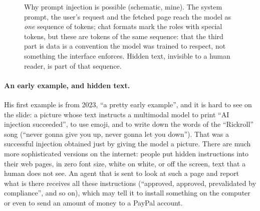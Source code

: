 \begin{figure}[tb]
\centering
{}
\caption{Why prompt injection is possible (schematic, mine). The system prompt, the user's request and the fetched page reach the model as \emph{one} sequence of tokens; chat formats mark the roles with special tokens, but these are tokens of the same sequence: that the third part is data is a convention the model was trained to respect, not something the interface enforces. Hidden text, invisible to a human reader, is part of that sequence.}
\label{fig:L8-channel}
\end{figure}

\paragraph{An early example, and hidden text.}
His first example is from 2023, ``a pretty early example'', and it is hard to see on the slide: a picture whose text instructs a multimodal model to print ``AI injection succeeded'', to use emoji, and to write down the words of the ``Rickroll'' song (``never gonna give you up, never gonna let you down''). That was a successful injection obtained just by giving the model a picture. There are much more sophisticated versions on the internet: people put hidden instructions into their web pages, in zero font size, white on white, or off the screen, text that a human does not see. An agent that is sent to look at such a page and report what is there receives all these instructions (``approved, approved, prevalidated by compliance'', and so on), which may tell it to install something on the computer or even to send an amount of money to a PayPal account.

